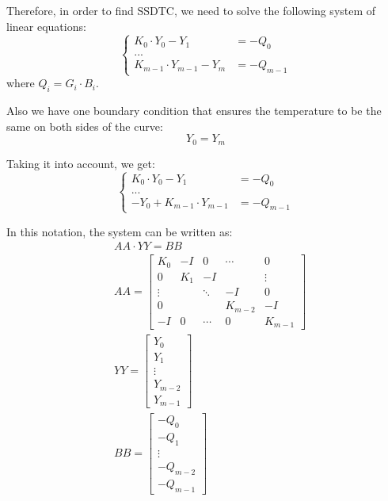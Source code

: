 Therefore, in order to find SSDTC, we need to solve the following system of linear equations:
\[
  \begin{cases}
    K_0 \cdot Y_0 - Y_1 & = -Q_0 \\
    ... \\
    K_{m-1} \cdot Y_{m-1} - Y_{m} & = -Q_{m-1}
  \end{cases}
\]
where $Q_i = G_i \cdot B_i$.

Also we have one boundary condition that ensures the temperature to be the same on both sides of the curve:
\begin{equation} \label{eq:boundary-condition}
  Y_0 = Y_m
\end{equation}

Taking it into account, we get:
\[
  \begin{cases}
    K_0 \cdot Y_0 - Y_1 & =-Q_0 \\
    ... \\
    -Y_0 + K_{m-1} \cdot Y_{m-1} & = -Q_{m-1}
  \end{cases}
\]

In this notation, the system can be written as:
\begin{align}
  & AA \cdot YY = BB \label{eq:system} \\
  & AA = \left[
    \begin{array}{ccccc}
      K_0 & -I & 0 & \cdots & 0 \\
      0 & K_1 & -I &  & \vdots \\
      \vdots &  & \ddots & -I & 0 \\
      0 &  &  & K_{m-2} & -I \\
      -I & 0 & \cdots & 0 & K_{m-1}
    \end{array}
  \right] \nonumber \\
  & YY = \left[
    \begin{array}{c}
      Y_0 \\
      Y_1 \\
      \vdots \\
      Y_{m-2} \\
      Y_{m-1}
    \end{array}
  \right] \nonumber \\
  & BB = \left[
    \begin{array}{c}
      -Q_0 \\
      -Q_1 \\
      \vdots \\
      -Q_{m-2} \\
      -Q_{m-1}
    \end{array}
  \right] \nonumber
\end{align}

